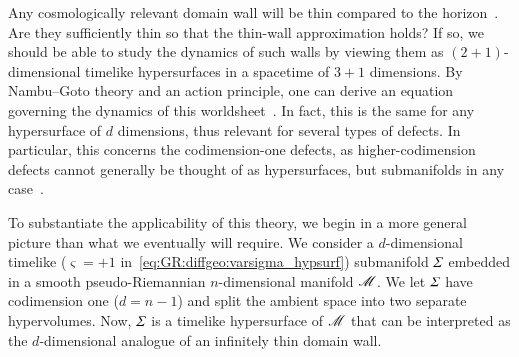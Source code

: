 



\newcommand*\hypsurf{\ALIAShypsurf}             %
\newcommand*\sppt{\ALIASsppt}                   %
\newcommand*\pert{\ALIASpert}                   %
\newcommand*\hypacc{\widehat}                   %
\newcommand*\Ft{\ALIASFt}                       %
\newcommand*\dummy{\ALIASdummy}                 %
\newcommand*\Tw{\ALIASTw}
\newcommand*\Twf{\ALIASTwf}







Any cosmologically relevant domain wall will be thin compared to the horizon~\citep{pressDynamicalEvolutionDomain1989}. Are they sufficiently thin so that the thin-wall approximation holds? If so, we should be able to study the dynamics of such walls by viewing them as $(2+1)$-dimensional timelike hypersurfaces in a spacetime of $3+1$ dimensions. 
By Nambu--Goto theory and an action principle, one can derive an equation governing the dynamics of this worldsheet~\citep{vilenkinCosmicStringsOther1994}. In fact, this is the same for any hypersurface of $d$ dimensions, thus relevant for several types of defects. In particular, this concerns the codimension-one defects, as higher-codimension defects cannot generally be thought of as hypersurfaces, but submanifolds in any case~\citep{vachaspatiKinksDomainWalls2006}. 




To substantiate the applicability of this theory, we begin in a more general picture than what we eventually will require. We consider a $d$-dimensional timelike ($\varsigma = +1$ in~\cref{eq:GR:diffgeo:varsigma_hypsurf}) submanifold $\hypsurf$ embedded in a smooth pseudo-Riemannian $n$-dimensional manifold $\mathscr{M}$. %
We let $\hypsurf$ have codimension one ($d=n-1$) and split the ambient space into two separate hypervolumes. Now, $\hypsurf$ is a timelike hypersurface of $\mathscr{M}$ that can be interpreted as the $d$-dimensional analogue of an infinitely thin domain wall. 


